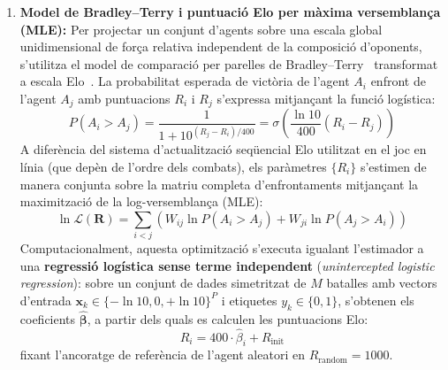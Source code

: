 \begin{enumerate}
    \item \textbf{Model de Bradley--Terry i puntuació Elo per màxima versemblança (MLE):}
          Per projectar un conjunt d'agents sobre una escala global unidimensional de força relativa independent de la composició d'oponents, s'utilitza el model de comparació per parelles de Bradley--Terry~\cite{bradley_terry_1952} transformat a escala Elo~\cite{elo_rating}. La probabilitat esperada de victòria de l'agent $A_i$ enfront de l'agent $A_j$ amb puntuacions $R_i$ i $R_j$ s'expressa mitjançant la funció logística:
          \begin{equation}
              P(A_i > A_j) = \frac{1}{1 + 10^{(R_j - R_i)/400}} = \sigma\left( \frac{\ln 10}{400} (R_i - R_j) \right)
              \label{eq:elo_expected}
          \end{equation}
          A diferència del sistema d'actualització seqüencial Elo utilitzat en el joc en línia (que depèn de l'ordre dels combats), els paràmetres $\{R_i\}$ s'estimen de manera conjunta sobre la matriu completa d'enfrontaments mitjançant la maximització de la log-versemblança (MLE):
          \begin{equation}
              \ln \mathcal{L}(\mathbf{R}) = \sum_{i < j} \left( W_{ij} \ln P(A_i > A_j) + W_{ji} \ln P(A_j > A_i) \right)
              \label{eq:bradley_terry_mle}
          \end{equation}
          Computacionalment, aquesta optimització s'executa igualant l'estimador a una \textbf{regressió logística sense terme independent} (\emph{unintercepted logistic regression}): sobre un conjunt de dades simetritzat de $M$ batalles amb vectors d'entrada $\mathbf{x}_k \in \{-\ln 10, 0, +\ln 10\}^P$ i etiquetes $y_k \in \{0, 1\}$, s'obtenen els coeficients $\hat{\boldsymbol{\beta}}$, a partir dels quals es calculen les puntuacions Elo:
          \begin{equation}
              R_i = 400 \cdot \hat{\beta}_i + R_{\mathrm{init}}
              \label{eq:elo_logistic_regression}
          \end{equation}
          fixant l'ancoratge de referència de l'agent aleatori en $R_{\mathrm{random}} = 1000$.


\end{enumerate}
